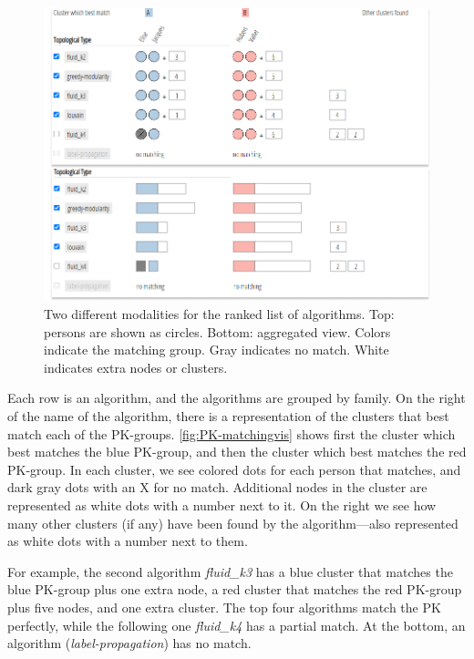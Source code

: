 \begin{figure}[!ht]
\centering
\includegraphics[width=\linewidth]{static/figures/PK-Clustering/VISPaperFigures/matchingExampleFinal.png}
\caption{Two different modalities for the ranked list of algorithms. Top: persons are shown as circles. Bottom: aggregated view. Colors indicate the matching group. Gray indicates no match. White indicates extra nodes or clusters.}
\label{fig:PK-matchingvis}
\end{figure}

Each row is an algorithm, and the algorithms are grouped by family. On the right of the name of the algorithm, there is a representation of the clusters that best match each of the PK-groups. \autoref{fig:PK-matchingvis} shows first the cluster which best matches the blue PK-group, and then the cluster which best matches the red PK-group. In each cluster, we see colored dots for each person that matches, and dark gray dots with an X for no match. Additional nodes in the cluster are represented as white dots with a number next to it.  On the right we see how many other clusters (if any) have been found by the algorithm---also represented as white dots with a number next to them.

For example, the second algorithm \emph{fluid\_k3} has a blue cluster that matches the blue PK-group plus one extra node, a red cluster that matches the red PK-group plus five nodes, and one extra cluster.
The top four algorithms match the PK perfectly, while the following one \emph{fluid\_k4} has a partial match. At the bottom, an algorithm (\emph{label-propagation}) has no match.

